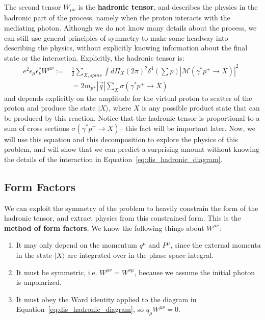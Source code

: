 \documentclass[11pt, oneside]{article}   	%
\theoremstyle{definition}
\begin{document}
The second tensor $W_{\mu\nu}$ is the \textbf{hadronic tensor}, and describes the physics in the hadronic part of the process, 
namely when the proton interacts with the mediating photon. Although we do not know many details about the process, we can still 
use general principles of symmetry to make some headway into describing the physics, without explicitly knowing information 
about the final state or the interaction. Explicitly, the hadronic tensor is:
\begin{align}
	e^2\epsilon_\mu\epsilon_\nu^* W^{\mu\nu} :=& \frac{1}{2}\sum_{X, spins} \int d\Pi_X (2\pi)^2\delta^4\left(\sum p\right)
	|\mathcal M(\gamma^*p^+\rightarrow X)|^2~
	\label{eq:hadronic_tensor}~
	\\
	& = 2m_{p^+}|\vec q|\sum_X \sigma(\gamma^*p^+\rightarrow X)~
	\label{eq:hadronic_tensor_cross}
\end{align}
and depends explicitly on the amplitude for the virtual proton to scatter of the proton and produce the state $|X\rangle$, where $X$ 
is any possible product state that can be produced by this reaction. Notice that the hadronic tensor is proportional to a sum of cross 
sections $\sigma(\gamma^* p^+\rightarrow X)$-- this fact will be important later. Now, we will use this equation and this 
decomposition to explore the physics of this problem, and will show that we can predict a surprising amount without knowing 
the details of the interaction in Equation~\ref{eq:dis_hadronic_diagram}.

\subsection{Form Factors}

We can exploit the symmetry of the problem to heavily constrain the form of the hadronic tensor, and 
extract physics from this constrained form. This is the \textbf{method of form factors}. We know the following things about 
$W^{\mu\nu}$:
\begin{enumerate}
	\item It may only depend on the momentum $q^\mu$ and $P^\mu$, since the external momenta in the state $|X\rangle$ are 
	integrated over in the phase space integral. 
	\item It must be symmetric, i.e. $W^{\mu\nu} = W^{\nu\mu}$, because we assume the initial photon is unpolarized. 
	\item It must obey the Ward identity applied to the diagram in Equation~\ref{eq:dis_hadronic_diagram}, so $q_\mu W^{\mu\nu} = 0$. 
\end{enumerate}
\end{document}
